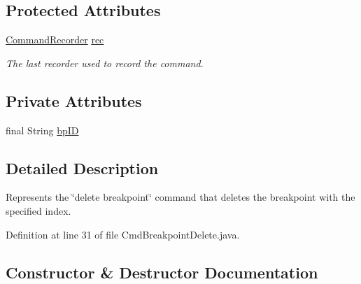 \subsection*{Protected Attributes}
\begin{DoxyCompactItemize}
\item 
\hyperlink{classgov_1_1nasa_1_1jpf_1_1inspector_1_1client_1_1_command_recorder}{Command\+Recorder} \hyperlink{classgov_1_1nasa_1_1jpf_1_1inspector_1_1client_1_1_client_command_af4246f2427035c72a6af45a2c61361f7}{rec}
\begin{DoxyCompactList}\small\item\em The last recorder used to record the command. \end{DoxyCompactList}\end{DoxyCompactItemize}
\subsection*{Private Attributes}
\begin{DoxyCompactItemize}
\item 
final String \hyperlink{classgov_1_1nasa_1_1jpf_1_1inspector_1_1client_1_1commands_1_1_cmd_breakpoint_delete_ae86109f41e146a0e2085efb3d03fb9f1}{bp\+ID}
\end{DoxyCompactItemize}


\subsection{Detailed Description}
Represents the \char`\"{}delete breakpoint\char`\"{} command that deletes the breakpoint with the specified index. 

Definition at line 31 of file Cmd\+Breakpoint\+Delete.\+java.



\subsection{Constructor \& Destructor Documentation}
